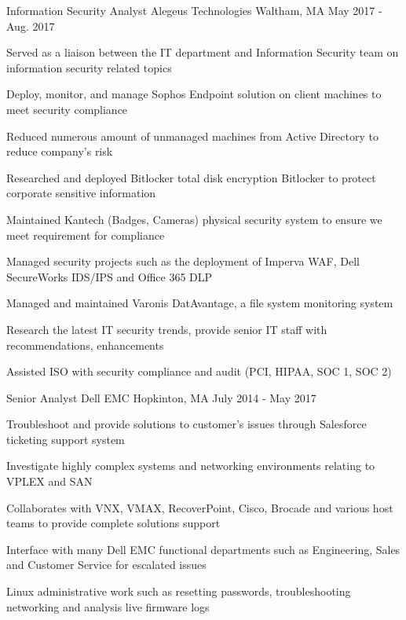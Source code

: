 \begin{cventries}
  \cventry
    {Information Security Analyst} %
    {Alegeus Technologies} %
    {Waltham, MA} %
    {May 2017 - Aug. 2017} %
    {
      \begin{cvitems} %
        \item {Served as a liaison between the IT department and Information Security team on information security related
        topics}
        \item {Deploy, monitor, and manage Sophos Endpoint solution on client machines to meet security compliance}
        \item {Reduced numerous amount of unmanaged machines from Active Directory to reduce company’s risk}
        \item {Researched and deployed Bitlocker total disk encryption Bitlocker to protect corporate sensitive information}
        \item {Maintained Kantech (Badges, Cameras) physical security system to ensure we meet requirement for
        compliance}
        \item {Managed security projects such as the deployment of Imperva WAF, Dell SecureWorks IDS/IPS and Office
        365 DLP}
        \item {Managed and maintained Varonis DatAvantage, a file system monitoring system}
        \item {Research the latest IT security trends, provide senior IT staff with recommendations, enhancements}
        \item {Assisted ISO with security compliance and audit (PCI, HIPAA, SOC 1, SOC 2)}
      \end{cvitems}
    }

  \cventry
    {Senior Analyst} %
    {Dell EMC} %
    {Hopkinton, MA} %
    {July 2014 - May 2017} %
    {
      \begin{cvitems} %
        \item {Troubleshoot and provide solutions to customer’s issues through Salesforce ticketing support system}
		    \item {Investigate highly complex systems and networking environments relating to VPLEX and SAN}
        \item {Collaborates with VNX, VMAX, RecoverPoint, Cisco, Brocade and various host teams to provide complete
        solutions support}
        \item {Interface with many Dell EMC functional departments such as Engineering, Sales and Customer Service for
        escalated issues}
        \item {Linux administrative work such as resetting passwords, troubleshooting networking and analysis live firmware
        logs}
      \end{cvitems}
    }


\end{cventries}
